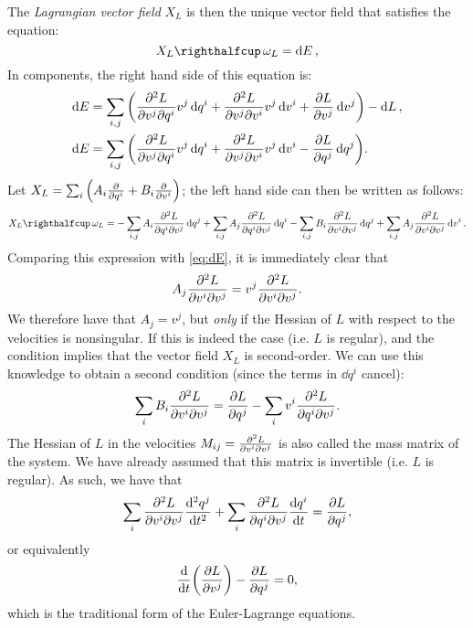 The \emph{Lagrangian vector field} $X_L$ is then the unique vector field that satisfies the equation: \cite{Godbillon1969}
\begin{equation}
    \intpr{X_L}{\omega_L} = \dd{E},
    \label{eq:EL_nocomp}
\end{equation}
In components, the right hand side of this equation is:
\begin{equation}
    \begin{split}
        \dd{E} &= \sum_{i, j}\qty(\pdv[2]{L}{v^j}{q^i}v^j\dd{q^i} + \pdv[2]{L}{v^j}{v^i}v^j\dd{v^i} + \pdv{L}{v^j}\dd{v^j}) - \dd{L}, \\
        \dd{E} &= \sum_{i, j}\qty(\pdv[2]{L}{v^j}{q^i}v^j\dd{q^i} + \pdv[2]{L}{v^j}{v^i}v^j\dd{v^i} - \pdv{L}{q^j}\dd{q^j}).
    \end{split}
    \label{eq:dE}
\end{equation}
Let $X_L = \sum_i \qty( A_i \pdv{}{q^i} + B_i\pdv{}{v^i}) $; the left hand side can then be written as follows:
\begin{equation}
    \intpr{X_L}{\omega_L} =  - \sum_{i,j} A_i \pdv[2]{L}{q^i}{v^j}\dd{q^j} 
                             + \sum_{i,j} A_j \pdv[2]{L}{q^i}{v^j}\dd{q^i} 
                             - \sum_{i, j} B_i \pdv[2]{L}{v^i}{v^j}\dd{q^j}
                             + \sum_{i, j} A_j \pdv[2]{L}{v^i}{v^j}\dd{v^i}.
\end{equation}
Comparing this expression with \cref{eq:dE}, it is immediately clear that
$$ A_j \pdv[2]{L}{v^i}{v^j} = v^j \pdv[2]{L}{v^i}{v^j}.$$
We therefore have that $A_j = v^j$, but \emph{only} if the Hessian of $L$ with respect to the velocities is nonsingular. If this is indeed the case (i.e. $L$ is regular), and the condition implies that the vector field $X_L$ is second-order. We can use this knowledge to obtain a second condition (since the terms in $\dd{q^i}$ cancel): 
$$
    \sum_{i} B_i \pdv[2]{L}{v^i}{v^j} = \pdv{L}{q^j} - \sum_{i} v^i \pdv[2]{L}{q^i}{v^j}.  
$$
The Hessian of $L$ in the velocities $M_{ij} = \pdv[2]{L}{v^i}{v^j}$ is also called the mass matrix of the system. We have already assumed that this matrix is invertible (i.e. $L$ is regular). As such, we have that
$$ \sum_{i}\pdv[2]{L}{v^i}{v^j}\dv[2]{q^j}{t} + \sum_{i} \pdv[2]{L}{q^i}{v^j}\dv{q^i}{t} = \pdv{L}{q^j}, $$
or equivalently
$$ \dv{}{t}\qty(\pdv{L}{v^j}) - \pdv{L}{q^j} = 0, $$
which is the traditional form of the Euler-Lagrange equations.

